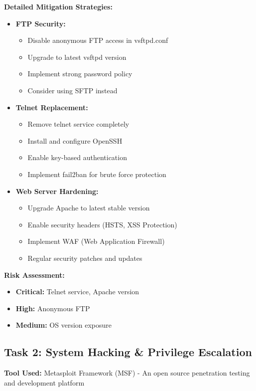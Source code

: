 \documentclass[12pt]{article}
\begin{document}
\textbf{Detailed Mitigation Strategies:}
\begin{itemize}
  \item \textbf{FTP Security:}
    \begin{itemize}
      \item Disable anonymous FTP access in vsftpd.conf
      \item Upgrade to latest vsftpd version
      \item Implement strong password policy
      \item Consider using SFTP instead
    \end{itemize}
  \item \textbf{Telnet Replacement:}
    \begin{itemize}
      \item Remove telnet service completely
      \item Install and configure OpenSSH
      \item Enable key-based authentication
      \item Implement fail2ban for brute force protection
    \end{itemize}
  \item \textbf{Web Server Hardening:}
    \begin{itemize}
      \item Upgrade Apache to latest stable version
      \item Enable security headers (HSTS, XSS Protection)
      \item Implement WAF (Web Application Firewall)
      \item Regular security patches and updates
    \end{itemize}
\end{itemize}

\textbf{Risk Assessment:}
\begin{itemize}
  \item \textbf{Critical:} Telnet service, Apache version
  \item \textbf{High:} Anonymous FTP
  \item \textbf{Medium:} OS version exposure
\end{itemize}

\subsection*{Task 2: System Hacking \& Privilege Escalation}
\textbf{Tool Used:} Metasploit Framework (MSF) - An open source penetration testing and development platform
\end{document}
